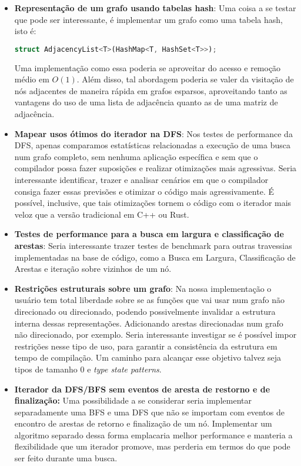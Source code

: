 \begin{itemize}
  \item \textbf{Representação de um grafo usando tabelas hash}: Uma
    coisa a se testar que pode ser interessante, é implementar um
    grafo como uma tabela hash, isto é:
    \begin{lstlisting}[language=Rust]
      struct AdjacencyList<T>(HashMap<T, HashSet<T>>);
    \end{lstlisting}
    Uma implementação como essa poderia se aproveitar do acesso e
    remoção médio em $O(1)$. Além disso, tal abordagem poderia se
    valer da visitação de nós adjacentes de maneira rápida em grafos
    esparsos, aproveitando tanto as vantagens do uso de uma lista de
    adjacência quanto as de uma matriz de adjacência.
  \item \textbf{Mapear usos ótimos do iterador na DFS}: Nos testes de
    performance da DFS, apenas comparamos estatísticas relacionadas a
    execução de uma busca num grafo completo, sem nenhuma aplicação
    específica e sem que o compilador possa fazer suposições e
    realizar otimizações mais agressivas. Seria interessante
    identificar, trazer e analisar cenários em que o compilador
    consiga fazer essas previsões e otimizar o código mais
    agressivamente. É possível, inclusive, que tais otimizações tornem
    o código com o iterador mais veloz que a versão tradicional em C++ ou Rust.
  \item \textbf{Testes de performance para a busca em largura e
    classificação de arestas}: Seria interessante trazer testes de
    benchmark para outras travessias implementadas na base de código,
    como a Busca em Largura, Classificação de Arestas e iteração sobre
    vizinhos de um nó.
  \item \textbf{Restrições estruturais sobre um grafo}: Na nossa
    implementação o usuário tem total liberdade sobre se as funções
    que vai usar num grafo não direcionado ou direcionado, podendo
    possivelmente invalidar a estrutura interna dessas
    representações. Adicionando arestas direcionadas num grafo não
    direcionado, por exemplo. Seria interessante investigar se é
    possível impor restrições nesse tipo de uso, para garantir a
    consistência da estrutura em tempo de compilação. Um caminho para
    alcançar esse objetivo talvez seja tipos de tamanho 0 e
    \textit{type state patterns}.
  \item \textbf{Iterador da DFS/BFS sem eventos de aresta de restorno
    e de finalização:} Uma possibilidade a se considerar seria
    implementar separadamente uma BFS e uma DFS que não se importam
    com eventos de encontro de arestas de retorno e finalização de um
    nó. Implementar um algoritmo separado dessa forma emplacaria
    melhor performance e manteria a flexibilidade que um iterador
    promove, mas perderia em termos do que pode ser feito durante uma busca.
\end{itemize}

